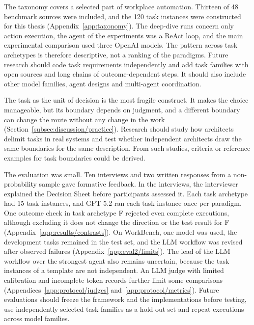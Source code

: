 The taxonomy covers a selected part of workplace automation. Thirteen of 48 benchmark sources were included, and the 120 task instances were constructed for this thesis (Appendix~\ref{app:taxonomy}). The deep-dive runs concern only action execution, the agent of the experiments was a ReAct loop, and the main experimental comparison used three OpenAI models. The pattern across task archetypes is therefore descriptive, not a ranking of the paradigms. Future research should code task requirements independently and add task families with open sources and long chains of outcome-dependent steps. It should also include other model families, agent designs and multi-agent coordination.

The task as the unit of decision is the most fragile construct. It makes the choice manageable, but its boundary depends on judgment, and a different boundary can change the route without any change in the work (Section~\ref{subsec:discussion/practice}). Research should study how architects delimit tasks in real systems and test whether independent architects draw the same boundaries for the same description. From such studies, criteria or reference examples for task boundaries could be derived.

The evaluation was small. Ten interviews and two written responses from a non-probability sample gave formative feedback. In the interviews, the interviewer explained the Decision Sheet before participants assessed it. Each task archetype had 15 task instances, and GPT-5.2 ran each task instance once per paradigm. One outcome check in task archetype F rejected even complete executions, although excluding it does not change the direction or the test result for F (Appendix~\ref{app:results/contrasts}). On WorkBench, one model was used, the development tasks remained in the test set, and the LLM workflow was revised after observed failures (Appendix~\ref{app:eval2/limits}). The lead of the LLM workflow over the strongest agent also remains uncertain, because the task instances of a template are not independent. An LLM judge with limited calibration and incomplete token records further limit some comparisons (Appendices~\ref{app:protocol/judges} and~\ref{app:protocol/metrics}). Future evaluations should freeze the framework and the implementations before testing, use independently selected task families as a hold-out set and repeat executions across model families.

